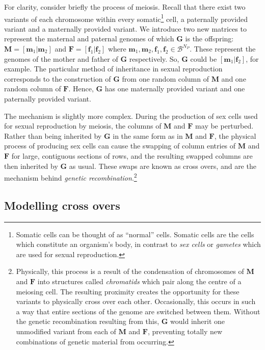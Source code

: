 \documentclass{article}
\newcommand{\ve}[1]{\mathbf{#1}}           %
\newcommand{\m}[1]{\mathbf{#1}}               %
\begin{document}
For clarity, consider briefly the process of meiosis. Recall that there exist two variants of each chromosome within every somatic\footnote{Somatic cells can be thought of as ``normal'' cells. Somatic cells are the cells which constitute an organism's body, in contrast to \textit{sex cells} or \textit{gametes} which are used for sexual reproduction.} cell, a paternally provided variant and a maternally provided variant. We introduce two new matrices to represent the maternal and paternal genomes of which $\m{G}$ is the offspring: $\m{M} = [\ve{m}_1| \ve{m}_2]$ and $\m{F} = [\ve{f}_1| \ve{f}_2]$ where $\ve{m}_1, \ve{m}_2, \ve{f}_1, \ve{f}_2 \in \mathcal{B}^{N_P}$. These represent the genomes of the mother and father of $\m{G}$ respectively. So, $\m{G}$ could be $[\ve{m}_1 | \ve{f}_2]$, for example. The particular method of inheritance in sexual reproduction corresponds to the construction of $\m{G}$ from one random column of $\m{M}$ and one random column of $\m{F}$. Hence, $\m{G}$ has one maternally provided variant and one paternally provided variant.

The mechanism is slightly more complex. During the production of sex cells used for sexual reproduction by meiosis, the columns of $\m{M}$ and $\m{F}$ may be perturbed. Rather than being inherited by $\m{G}$ in the same form as in $\m{M}$ and $\m{F}$, the physical process of producing sex cells can cause the swapping of column entries of $\m{M}$ and $\m{F}$ for large, contiguous sections of rows, and the resulting swapped columns are then inherited by $\m{G}$ as usual. These swaps are known as cross overs, and are the mechanism behind \textit{genetic recombination}.\footnote{Physically, this process is a result of the condensation of chromosomes of $\m{M}$ and $\m{F}$ into structures called \textit{chromatids} which pair along the centre of a meiosing cell. The resulting proximity creates the opportunity for these variants to physically cross over each other. Occasionally, this occurs in such a way that entire sections of the genome are switched between them. Without the genetic recombination resulting from this, $\m{G}$ would inherit one unmodified variant from each of $\m{M}$ and $\m{F}$, preventing totally new combinations of genetic material from occurring.}

\subsection{Modelling cross overs} \label{subsec:modelcrossing}
\end{document}
